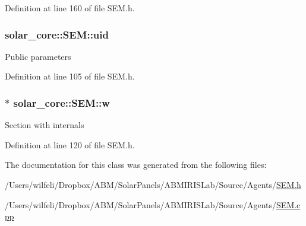 Definition at line 160 of file S\+E\+M.\+h.

\hypertarget{classsolar__core_1_1_s_e_m_a9d8fcdda966f46763b83c280c4ba4dbf}{}
\subsubsection[{uid}]{ solar\+\_\+core\+::\+S\+E\+M\+::uid}\label{classsolar__core_1_1_s_e_m_a9d8fcdda966f46763b83c280c4ba4dbf}
Public parameters 

Definition at line 105 of file S\+E\+M.\+h.

\hypertarget{classsolar__core_1_1_s_e_m_a6ef9eb7ba22b2c76c73635843b6cac4e}{}
\subsubsection[{w}]{$\ast$ solar\+\_\+core\+::\+S\+E\+M\+::w\hspace{0.3cm}{\ttfamily [protected]}}\label{classsolar__core_1_1_s_e_m_a6ef9eb7ba22b2c76c73635843b6cac4e}
Section with internals 

Definition at line 120 of file S\+E\+M.\+h.



The documentation for this class was generated from the following files\+:\begin{DoxyCompactItemize}
\item 
/\+Users/wilfeli/\+Dropbox/\+A\+B\+M/\+Solar\+Panels/\+A\+B\+M\+I\+R\+I\+S\+Lab/\+Source/\+Agents/\hyperlink{_s_e_m_8h}{S\+E\+M.\+h}\item 
/\+Users/wilfeli/\+Dropbox/\+A\+B\+M/\+Solar\+Panels/\+A\+B\+M\+I\+R\+I\+S\+Lab/\+Source/\+Agents/\hyperlink{_s_e_m_8cpp}{S\+E\+M.\+cpp}\end{DoxyCompactItemize}

